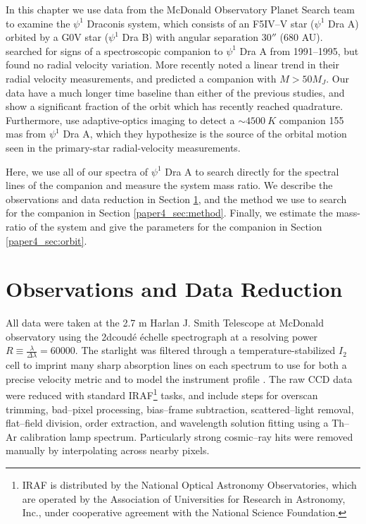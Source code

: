 In this chapter we use data from the McDonald Observatory Planet Search team to examine the $\psi^1$ Draconis system, which consists of an F5IV--V star ($\psi^1$ Dra A) orbited by a G0V star ($\psi^1$ Dra B) with angular separation $30''$ \citep{WDS} (680 AU). \cite{Tokovinin2002} searched for signs of a spectroscopic companion to $\psi^1$ Dra A from 1991--1995, but found no radial velocity variation. More recently \cite{Toyota2009} noted a linear trend in their radial velocity measurements, and predicted a companion with $M > 50 M_J$. Our data have a much longer time baseline than either of the previous studies, and show a significant fraction of the orbit which has recently reached quadrature. Furthermore, \citet{Endl2015} use adaptive-optics imaging to detect a $\sim 4500\ K$ companion 155 mas from $\psi^1$ Dra A, which they hypothesize is the source of the orbital motion seen in the primary-star radial-velocity measurements. 

Here, we use all of our spectra of $\psi^1$ Dra A to search directly for the spectral lines of the companion and measure the system mass ratio. We describe the observations and data reduction in Section \ref{paper4_sec:obs}, and the method we use to search for the companion in Section \ref{paper4_sec:method}. Finally, we estimate the mass-ratio of the system and give the parameters for the companion in Section \ref{paper4_sec:orbit}.


\section{Observations and Data Reduction}
\label{paper4_sec:obs}
All data were taken at the 2.7 m Harlan J. Smith Telescope at McDonald observatory using the 2dcoud\'e \'echelle spectrograph \citep{TS23} at a resolving power $R\equiv \frac{\lambda}{\Delta \lambda} = 60000$. The starlight was filtered through a temperature-stabilized $I_2$ cell to imprint many sharp absorption lines on each spectrum to use for both a precise velocity metric \citep{Butler1996} and to model the instrument profile \citep{Endl2000}. The raw CCD data were reduced with standard IRAF\footnote{IRAF is distributed by the National Optical Astronomy Observatories, which are operated by the Association of Universities for Research in Astronomy, Inc., under cooperative agreement with the National Science Foundation.} tasks, and include steps for overscan trimming, bad--pixel processing, bias--frame subtraction, scattered--light removal, flat--field division, order extraction, and wavelength solution fitting using a Th--Ar calibration lamp spectrum. Particularly strong cosmic--ray hits were removed manually by interpolating across nearby pixels.

